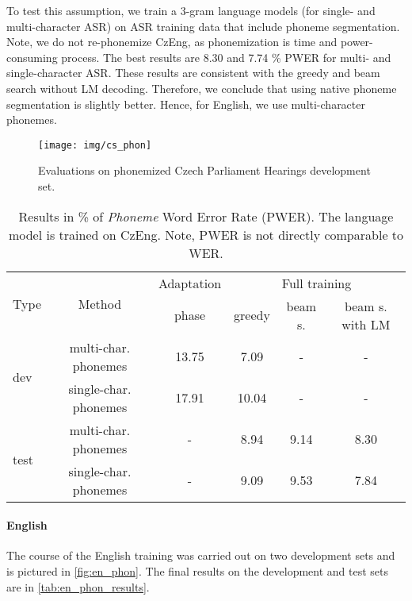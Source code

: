 To test this assumption, we train a 3-gram language models (for single- and multi-character ASR) on ASR training data that include phoneme segmentation. Note, we do not re-phonemize CzEng, as phonemization is time and power-consuming process. The best results are 8.30 and 7.74 \% PWER for multi- and single-character ASR. These results are consistent with the greedy and beam search without LM decoding. Therefore, we conclude that using native phoneme segmentation is slightly better. Hence, for English, we use multi-character phonemes.


\begin{figure*}[t]
	\texttt{[image: img/cs\_phon]}
	\caption{Evaluations on phonemized Czech Parliament Hearings development set.}
	\label{fig:cs_phon}
\end{figure*}

\begin{table}[t]
	\centering
	\begin{tabular}{lc|c|ccc}
		\multirow{2}{*}{Type} & \multirow{2}{*}{Method} & Adaptation & \multicolumn{3}{c}{Full training} \\
		&                       & phase & greedy & beam s. & beam s. with LM \\ \hline
		\multirow{2}{*}{dev}  & multi-char. phonemes  & 13.75 & 7.09   & -       & -               \\
		& single-char. phonemes & 17.91 & 10.04  & -       & -               \\ \hline
		\multirow{2}{*}{test} & multi-char. phonemes  & -     & 8.94   & 9.14    & 8.30            \\
		& single-char. phonemes & -     & 9.09   & 9.53    & 7.84           
	\end{tabular}
	\caption{Results in \% of \emph{Phoneme} Word Error Rate (PWER). The language model is trained on CzEng. Note, PWER is not directly comparable to WER. }
	\label{tab:cs_phon_results}
\end{table}

\paragraph{English}
The course of the English training was carried out on two development sets and is pictured in \cref{fig:en_phon}. The final results on the development and test sets are in \cref{tab:en_phon_results}. 


